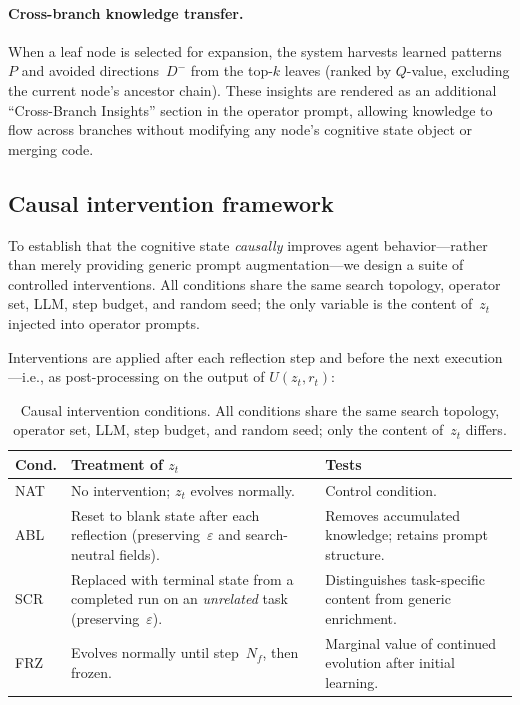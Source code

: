 \documentclass{article} %
\newcommand{\zt}{z_t}
\newcommand{\rt}{r_t}
\begin{document}
\paragraph{Cross-branch knowledge transfer.}
When a leaf node is selected for expansion, the system harvests learned
patterns~$P$ and avoided directions~$D^{-}$ from the top-$k$ leaves (ranked by
$Q$-value, excluding the current node's ancestor chain). These insights are
rendered as an additional ``Cross-Branch Insights'' section in the operator
prompt, allowing knowledge to flow across branches without modifying any
node's cognitive state object or merging code.


\subsection{Causal intervention framework}
\label{sec:intervention}

To establish that the cognitive state \emph{causally} improves agent
behavior---rather than merely providing generic prompt augmentation---we
design a suite of controlled interventions. All conditions share the same
search topology, operator set, LLM, step budget, and random seed; the only
variable is the content of~$\zt$ injected into operator prompts.

Interventions are applied after each reflection step and before the next
execution---i.e., as post-processing on the output of $U(\zt, \rt)$:

\begin{table}[t]
\caption{Causal intervention conditions. All conditions share the same
search topology, operator set, LLM, step budget, and random seed;
only the content of~$\zt$ differs.}
\label{tab:interventions}
\centering
\footnotesize
\begin{tabular}{@{}lp{4.8cm}p{4.5cm}@{}}
\toprule
\textbf{Cond.} & \textbf{Treatment of $\zt$} & \textbf{Tests} \\
\midrule
NAT & No intervention; $\zt$ evolves normally.
    & Control condition. \\
ABL & Reset to blank state after each reflection
      (preserving~$\varepsilon$ and search-neutral fields).
    & Removes accumulated knowledge; retains prompt structure. \\
SCR & Replaced with terminal state from a completed run on an
      \emph{unrelated} task (preserving~$\varepsilon$).
    & Distinguishes task-specific content from generic enrichment. \\
FRZ & Evolves normally until step~$N_f$, then frozen.
    & Marginal value of continued evolution after initial learning. \\
\bottomrule
\end{tabular}
\end{table}
\end{document}
